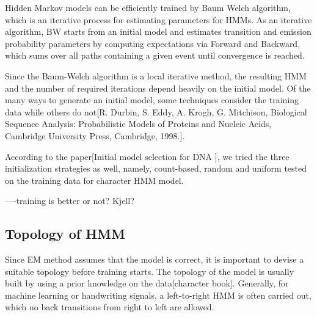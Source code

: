 \documentclass[11pt]{article}
\begin{document}
Hidden Markov models can be efficiently trained by Baum Welch algorithm, which is an iterative process for estimating parameters for HMMs. As an iterative algorithm, BW starts from an initial model and estimates transition and emission probability parameters by computing expectations via Forward and Backward, which sums over all paths containing a given event until convergence is reached.

Since the Baum-Welch algorithm is a local iterative method, the resulting HMM and the number of required iterations depend heavily on the initial model. Of the many ways to generate an initial model, some techniques consider the training data while others do not[R. Durbin, S. Eddy, A. Krogh, G. Mitchison, Biological Sequence Analysis: Probabilistic Models of Proteins and Nucleic Acids, Cambridge University Press, Cambridge, 1998.].

According to the paper[Initial model selection for DNA ], we tried the three initialization strategies as well, namely, count-based, random and uniform tested on the training data for character HMM model.

----training is better or not? Kjell?

\subsection{Topology of HMM}

Since EM method assumes that the model is correct, it is important to devise a suitable topology before training starts. The topology of the model is usually built by using a prior knowledge on the data[character book]. Generally, for machine learning or handwriting signals, a left-to-right HMM is often carried out, which no back transitions from right to left are allowed.
\end{document}
